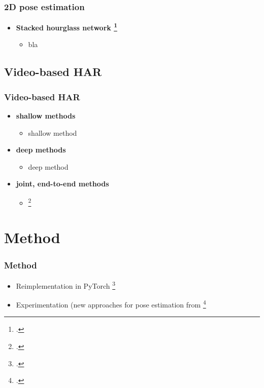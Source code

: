 \documentclass[9pt]{beamer}
\providecommand{\fcite}[1]{\footcite{#1}}
\newenvironment{myframe}[1][]{%
\begin{frame}%
\frametitle{#1}
\setcounter{footnote}{0}


}{%
\end{frame}%
}
\begin{document}
\begin{myframe}[2D pose estimation]
    \begin{itemize}
        \item \textbf{Stacked hourglass network \fcite{newell_stacked_2016}}
      \begin{itemize}
        \item bla
      \end{itemize}
    \end{itemize}
\end{myframe}

\subsection{Video-based HAR}
\begin{myframe}[Video-based HAR]
  \begin{itemize}
    \item \textbf{shallow methods}
    \begin{itemize}
      \item shallow method
    \end{itemize}
    \item \textbf{deep methods}
    \begin{itemize}
      \item deep method
    \end{itemize}
    \item \textbf{joint, end-to-end methods}
    \begin{itemize}
        \item \fcite{luvizon_2d/3d_2018}
    \end{itemize}
  \end{itemize}
\end{myframe}

\section{Method}
\begin{myframe}[Method]
    \begin{itemize}
        \item Reimplementation in PyTorch \fcite{paszke_automatic_2017}
        \item Experimentation (new approaches for pose estimation from \fcite{pavllo_3d_2019}
    \end{itemize}
\end{myframe}
\end{document}
